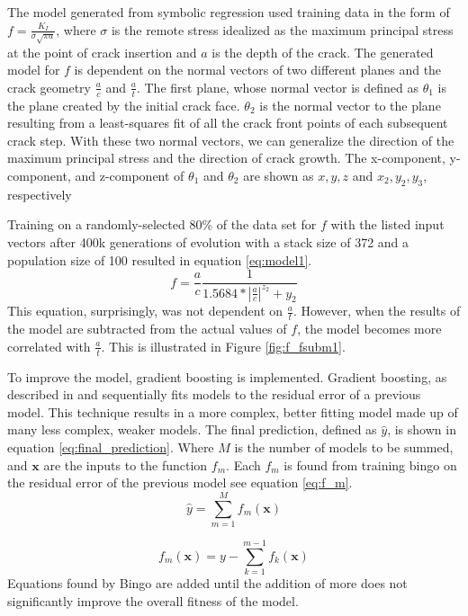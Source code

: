The model generated from symbolic regression used training data in the form of
$f = \frac{K_I}{\sigma \sqrt{\pi a}}$, where $\sigma$ is the remote stress
idealized as the maximum principal stress at the point of crack insertion and
$a$ is the depth of the crack. The generated model for $f$ is dependent on the
normal vectors of two different planes and the crack geometry $\frac{a}{c}$ and
$\frac{a}{t}$. The first plane, whose normal vector is defined as $\theta_1$ is
the plane created by the initial crack face.  $\theta_2$ is the normal vector to
the plane resulting from a least-squares fit of all the crack front points of
each subsequent crack step. With these two normal vectors, we can
generalize the direction of the maximum principal stress and the direction of
crack growth.  The x-component, y-component, and z-component of $\theta_1$ and
$\theta_2$ are shown as $x, y, z$ and $x_2, y_2, y_3$, respectively

Training on a randomly-selected 80\% of the data set for $f$ with the listed
input vectors after 400k generations of evolution with a stack size of 372
and a population size of 100 resulted in equation \ref{eq:model1}. \begin{equation} \label{eq:model1}
f = \frac{a}{c}\frac{1}{1.5684 * |\frac{a}{c}|^{z_2} + y_2}
\end{equation}This equation,
surprisingly, was not dependent on $\frac{a}{t}$. However, when the results of
the model are subtracted from the actual values of $f$, the model becomes more
correlated with $\frac{a}{t}$. This is illustrated in Figure \ref{fig:f_fsubm1}. 

To improve the model, gradient boosting is implemented.  Gradient boosting, as
described in \cite{friedman2002stochastic} and sequentially fits models to the
residual error of a previous model. This technique results in a more complex,
better fitting model made up of many less complex, weaker models. The final
prediction, defined as $\hat{y}$, is shown in equation
\ref{eq:final_prediction}. Where $M$ is the number of models to be summed, and
$\textbf{x}$ are the inputs to the function $f_m$. Each $f_m$ is found from
training bingo on the residual error of the previous model see equation \ref{eq:f_m}.
\begin{equation} \label{eq:final_prediction}
\hat{y} = \sum_{m=1}^{M} f_m(\textbf{x})
\end{equation}

\begin{equation} \label{eq:f_m}
f_m(\textbf{x}) = y - \sum_{k=1}^{m-1} f_k(\textbf{x})
\end{equation}
Equations found by Bingo are added until the addition of more does not significantly improve the overall fitness of the model.

